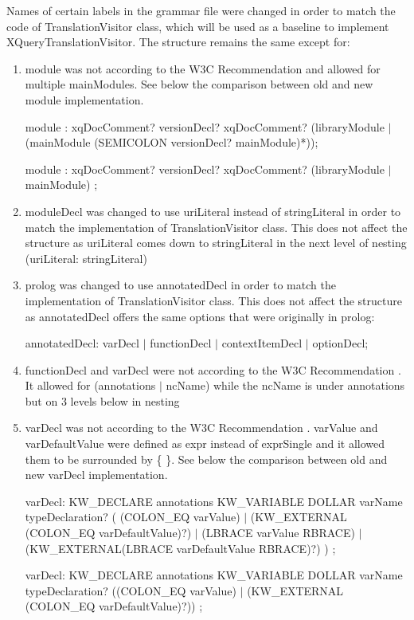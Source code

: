 Names of certain labels in the grammar file were changed in order to match the code of TranslationVisitor class, which will be used as a baseline to implement XQueryTranslationVisitor. The structure remains the same except for:
\begin{enumerate}
	
	\item module was not according to the W3C Recommendation \cite{XQueryRecommendation} and allowed for multiple mainModules. See below the comparison between old and new module implementation.
	
	module : xqDocComment? versionDecl? xqDocComment? (libraryModule $|$ (mainModule (SEMICOLON versionDecl? mainModule)*));
	
	module : xqDocComment? versionDecl? xqDocComment? (libraryModule $|$ mainModule) ;
	\item moduleDecl was changed to use uriLiteral instead of stringLiteral in order to match the implementation of TranslationVisitor class. This does not affect the structure as uriLiteral comes down to stringLiteral in the next level of nesting (uriLiteral: stringLiteral)
	\item prolog was changed to use annotatedDecl in order to match the implementation of TranslationVisitor class. This does not affect the structure as annotatedDecl offers the same options that were originally in prolog:
	
	annotatedDecl: varDecl $|$ functionDecl	$|$ contextItemDecl $|$ optionDecl;
	
	\item functionDecl and varDecl were not according to the W3C Recommendation \cite{XQueryRecommendation}. It allowed for (annotations $|$ ncName) while the ncName is under annotations but on 3 levels below in nesting
 	
	\item varDecl was not according to the W3C Recommendation \cite{XQueryRecommendation}. varValue and varDefaultValue were defined as expr instead of exprSingle and it allowed them to be surrounded by \{ \}. See below the comparison between old and new varDecl implementation.
	
	varDecl: KW\_DECLARE annotations KW\_VARIABLE DOLLAR varName typeDeclaration?
	(
	(COLON\_EQ varValue)
	$|$ (KW\_EXTERNAL (COLON\_EQ varDefaultValue)?)
	$|$ (LBRACE varValue RBRACE)
	$|$ (KW\_EXTERNAL(LBRACE varDefaultValue RBRACE)?)
	) ; 
	
	varDecl: KW\_DECLARE annotations KW\_VARIABLE DOLLAR varName typeDeclaration?
	((COLON\_EQ varValue)
	$|$ (KW\_EXTERNAL (COLON\_EQ varDefaultValue)?)) ;
	

\end{enumerate}
